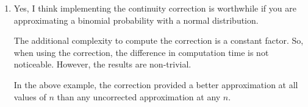 \documentclass[12pt,letterpaper]{article}
\begin{document}
\begin{enumerate}
\begin{enumerate}
        \item
          Yes, I think implementing the continuity correction is worthwhile if you are approximating a binomial probability with a normal distribution.

          The additional complexity to compute the correction is a constant factor. So, when using the correction, the difference in computation time is not noticeable. However, the results are non-trivial.

          In the above example, the correction provided a better approximation at all values of $n$ than any uncorrected approximation at any $n$.

      \end{enumerate}
  \end{enumerate}

  
\end{document}
